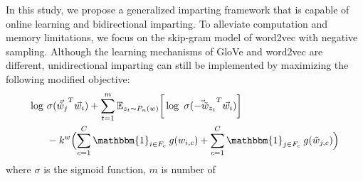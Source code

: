 \documentclass[11pt,a4paper]{article}
\newcommand{\indicator}{\ensuremath{\mathbbm{1}}}
\begin{document}
In this study, we propose a generalized imparting framework that is capable of online learning and bidirectional imparting. To alleviate computation and memory limitations, we focus on the skip-gram model of word2vec with negative sampling.
Although the learning mechanisms of GloVe and word2vec are
different, unidirectional imparting can still be implemented
by maximizing the following modified objective:
\begin{align}
\begin{split}
\log ~ & \sigma ({\vec{\tilde{w}}_{j}}^T \vec{w}_{i}) + \sum_{t = 1}^{m} {\mathbb{E}}_{z_t \sim P_n(w)} \bigg[ \log ~ \sigma({\vec{-\tilde{w}}_{z_t}}^T \vec{w}_{i}) \bigg] \\ 
& -k^w \Bigl(  \sum_{c=1}^{C} \indicator_{i\in{}F_c} \: g(w_{i,c}) + \sum_{c=1}^{C} \indicator_{j \in F_c} \: g(\tilde{w}_{j,c}) \Bigr)
\end{split}
\label{eq:word2vec_uni}
\end{align}
where $\sigma$ is the sigmoid function, $m$ is number of
\end{document}
